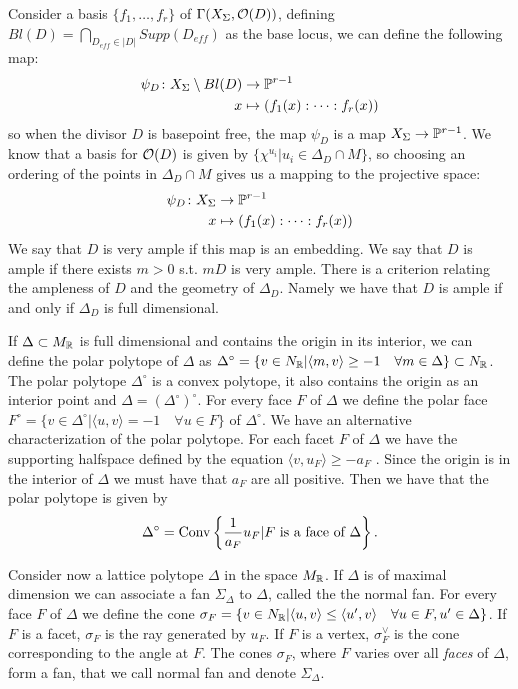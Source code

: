 \documentclass[../main.tex]{subfiles}
\begin{document}
Consider a basis $\{ f_1,\dots , f_r \}$ of $\Gamma(X_\Sigma,\mathcal{O}(D))$, defining $Bl(D)= \bigcap\limits_{D_{eff} \in |D|} Supp(D_{eff}) $ as the base locus, we can define
the following map:
\begin{align*}
\psi_D \colon X_\Sigma \setminus Bl(D) &\to \mathbb{P}^{r-1} \\
x &\mapsto (f_1(x) : \cdots : f_r(x))
\end{align*}
so when the divisor $D$ is basepoint free, the map $\psi_D$ is a map $X_\Sigma \to \mathbb{P}^{r-1}$. We know that a basis for $\mathcal{O}(D)$ is given by $\{ \chi^{u_i} | u_i \in \Delta_D \cap M \}$, so choosing an ordering of the points in $\Delta_D \cap M$ gives us a mapping to the projective space:
\begin{align*}
\psi_D \colon X_\Sigma &\to \mathbb{P}^{r-1} \\
x &\mapsto (f_1(x) : \cdots : f_r(x))
\end{align*}
We say that $D$ is very ample if this map is an embedding. We say that $D$ is ample if there exists $m >0$ s.t. $mD$ is very ample.
There is a criterion relating the ampleness of $D$ and the geometry of $\Delta_D$. Namely we have that $D$ is ample if and only if $\Delta_D$ is full dimensional.


%
%


If $\Delta \subset M_{\mathbb{R}}$ is full dimensional and contains the origin in its interior, we can define the polar polytope of $\Delta$ as $\Delta^\circ = \{ v \in N_{\mathbb{R}} | \langle m, v\rangle \geq -1 \quad \forall m \in \Delta \} \subset N_{\mathbb{R}}$.
The polar polytope $\Delta^\circ$ is a convex polytope, it also contains the origin as an interior point and  $\Delta =  (\Delta^\circ)^\circ$. For every face $F$ of $\Delta$ we define the polar face $F^\circ= \{v \in \Delta^\circ | \langle u, v\rangle = -1 \quad \forall u \in F \}$ of $\Delta^\circ$.
We have an alternative characterization of the polar polytope. For each facet $F$ of $\Delta$ we have the supporting halfspace defined by the equation $\langle v, u_F \rangle \geq -a_F$ . Since the origin is in the interior of $\Delta$ we must have that $a_F$ are all positive. Then we have that the polar polytope is given by
\begin{equation} \label{reflpol}
\Delta^\circ = \operatorname{Conv} \left\{\frac{1}{a_F} u_F | F \text{ is a face of } \Delta \right\} .
\end{equation}


Consider now a lattice polytope $\Delta$ in the space $M_{\mathbb{R}}$. If $\Delta$ is of maximal dimension we can associate a fan $\Sigma_\Delta$ to $\Delta$, called the the normal fan. For every face $F$ of $\Delta$ we define the cone $\sigma_F = \{ v \in N_{\mathbb{R}} | \langle u, v\rangle \leq \langle u^\prime, v \rangle \quad \forall u \in F, u^\prime \in \Delta \}$. If $F$ is a facet, $\sigma_F$ is the ray generated by $u_F$. If $F$ is a vertex, $\sigma^\vee_F$ is the cone corresponding to the angle at $F$. The cones $\sigma_F$, where $F$ varies over all \emph{faces} of $\Delta$, form a fan, that we call normal fan and denote $\Sigma_\Delta$.
%
%
%
%
%
\end{document}

